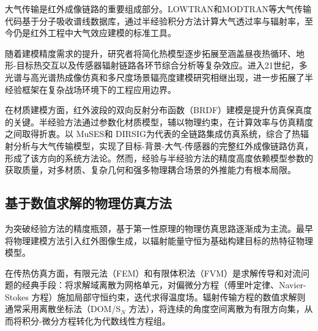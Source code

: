 大气传输是红外成像链路的重要组成部分。LOWTRAN\cite{kneizysAtmosphericTransmittanceRadiance1978}和MODTRAN\cite{MODTRANModerateResolution1987,berkMODTRAN6MajorUpgrade2014}等大气传输代码基于分子吸收谱线数据库，通过半经验积分方法计算大气透过率与辐射率，至今仍是红外工程中大气效应建模的标准工具。

随着建模精度需求的提升，研究者将简化热模型逐步拓展至涵盖昼夜热循环\cite{curtisDiurnalSeasonalVariation1990}、地形-目标热交互\cite{gondaExplanationVehicleterrainInteraction2003}以及传感器辐射链路各环节综合分析\cite{nandhakumarIntegratedAnalysisThermal1988}等复杂效应。进入21世纪，多光谱与高光谱热成像仿真\cite{kwanSimulationHyperspectralThermal2008}和多尺度场景辐亮度建模\cite{naraniyaSceneSimulationModeling2021}研究相继出现，进一步拓展了半经验框架在复杂战场环境下的工程应用边界\cite{haynesAccurateSceneModeling2003}。

在材质建模方面，红外波段的双向反射分布函数（BRDF）建模是提升仿真保真度的关键\cite{priestPolarimetricMicrofacetScattering2002}。半经验方法通过参数化材质模型，辅以物理约束，在计算效率与仿真精度之间取得折衷\cite{balfourSemiempiricalModelbasedApproach1997,schottIncorporationTextureMultispectral1995}。以 MuSES\cite{johnsonMuSESNewHeat1998}和 DIRSIG\cite{meyersModelingPolarimetricImaging2002}为代表的全链路集成仿真系统，综合了热辐射分析与大气传输模型，实现了目标-背景-大气-传感器的完整红外成像链路仿真，形成了该方向的系统方法论\cite{gondaComprehensiveMethodologyThermal1989}。然而，经验与半经验方法的精度高度依赖模型参数的获取质量，对多材质、复杂几何和强多物理耦合场景的外推能力有根本局限。

\subsection{基于数值求解的物理仿真方法}

为突破经验方法的精度瓶颈，基于第一性原理的物理仿真思路逐渐成为主流。\citeauthor{shefferComputerGeneratedIR1988}最早将物理建模方法引入红外图像生成，以辐射能量守恒为基础构建目标的热特征物理模型\cite{shefferComputerGeneratedIR1988}。

在传热仿真方面，有限元法（FEM）和有限体积法（FVM）是求解传导和对流问题的经典手段：将求解域离散为网格单元，对偏微分方程（傅里叶定律、Navier-Stokes 方程）施加局部守恒约束，迭代求得温度场\cite{patankarNumericalHeatTransfer1980,bergmanFundamentalsHeatMass2011}。辐射传输方程的数值求解则通常采用离散坐标法（DOM/S$_N$ 方法），将连续的角度空间离散为有限方向集，从而将积分-微分方程转化为代数线性方程组\cite{fivelandDiscreteOrdinatesSolutions1984,modestRadiativeHeatTransfer2013}。

